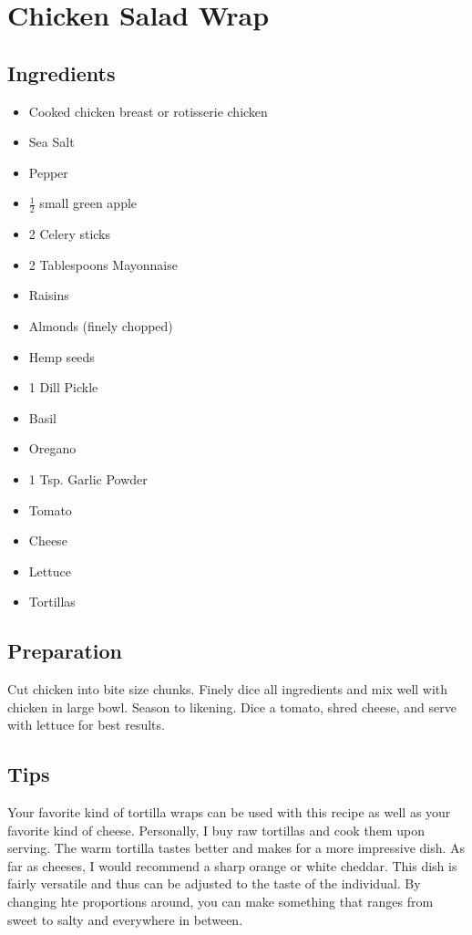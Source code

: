 \thispagestyle{fancy}
\section{Chicken Salad Wrap} \label{chicken salad wrap}
\AddToShipoutPicture*{\chickensaladwrap}


\subsection*{Ingredients}

\begin{multicols}{3}
	\begin{itemize}
		\item Cooked chicken breast or rotisserie chicken
		\item Sea Salt
		\item Pepper
		\item $\frac{1}{2}$ small green apple
		\item 2 Celery sticks
		\item 2 Tablespoons Mayonnaise
		\item Raisins
		\item Almonds (finely chopped)
		\item Hemp seeds
		\item 1 Dill Pickle
		\item Basil
		\item Oregano
		\item 1 Tsp. Garlic Powder
		\item Tomato
		\item Cheese 
		\item Lettuce
		\item Tortillas
	\end{itemize}
\end{multicols}

\subsection*{Preparation}

Cut chicken into bite size chunks. Finely dice all ingredients and mix well with chicken in large bowl. Season to likening. Dice a tomato, shred cheese, and serve with lettuce for best results.

\subsection*{Tips}

Your favorite kind of tortilla wraps can be used with this recipe as well as your favorite kind of cheese. Personally, I buy raw tortillas and cook them upon serving. The warm tortilla tastes better and makes for a more impressive dish. As far as cheeses, I would recommend a sharp orange or white cheddar. This dish is fairly versatile and thus can be adjusted to the taste of the individual. By changing hte proportions around, you can make something that ranges from sweet to salty and everywhere in between.
